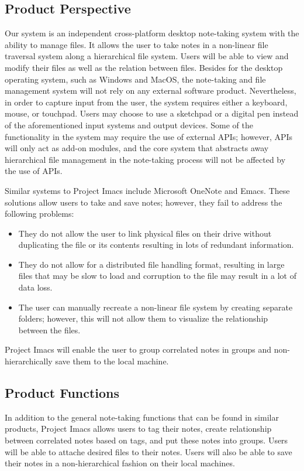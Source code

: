 \documentclass{article}
\begin{document}
\subsection{Product Perspective}
Our system is an independent cross-platform desktop note-taking system with the ability to manage files. It allows the user to take notes in a non-linear file traversal system along a hierarchical file system. Users will be able to view and modify their files as well as the relation between files. Besides for the desktop operating system, such as Windows and MacOS, the note-taking and file management system will not rely on any external software product. Nevertheless, in order to capture input from the user, the system requires either a keyboard, mouse, or touchpad. Users may choose to use a sketchpad or a digital pen instead of the aforementioned input systems and output devices. Some of the functionality in the system may require the use of external APIs; however, APIs will only act as add-on modules, and the core system that abstracts away hierarchical file management in the note-taking process will not be affected by the use of APIs.

Similar systems to Project Imacs include Microsoft OneNote and Emacs. These solutions allow users to take and save notes; however, they fail to address the following problems:

\begin{itemize}
    \item They do not allow the user to link physical files on their drive without duplicating the file or its contents resulting in lots of redundant information.
    \item They do not allow for a distributed file handling format, resulting in large files that may be slow to load and corruption to the file may result in a lot of data loss.
    \item The user can manually recreate a non-linear file system by creating separate folders; however, this will not allow them to visualize the relationship between the files.
\end{itemize}

Project Imacs will enable the user to group correlated notes in groups and non-hierarchically save them to the local machine.

\subsection{Product Functions}
In addition to the general note-taking functions that can be found in similar products, Project Imacs allows users to tag their notes, create relationship between correlated notes based on tags, and put these notes into groups. Users will be able to attache desired files to their notes. Users will also be able to save their notes in a non-hierarchical fashion on their local machines.
\end{document}

